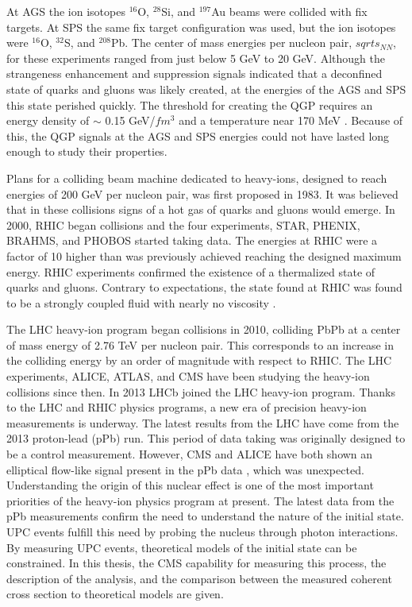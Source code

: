   At AGS the ion isotopes $^{16}$O, $^{28}$Si, and $^{197}$Au beams were 
    collided with fix targets. 
  At SPS the same fix target configuration was used, but the ion isotopes were 
    $^{16}$O, $^{32}$S, and $^{208}$Pb.
  The center of mass energies per nucleon pair, $sqrt{s_{NN}}$, for these 
    experiments ranged from just below 5 GeV to 20 GeV. 
  Although the strangeness enhancement and \JPsi{} suppression 
    signals indicated that a deconfined state of quarks and gluons was likely 
    created, at the energies of the AGS and SPS this state perished quickly. 
  The threshold for creating the QGP requires an energy density of $\sim$ 0.15 
    GeV/$fm$$^{3}$ and a temperature near 170 MeV \cite{qgpThresh}.
  Because of this, the QGP signals at the AGS and SPS energies could 
    not have lasted long enough to study their properties. 

  Plans for a colliding beam machine dedicated to heavy-ions, designed to reach 
    energies of 200 GeV per nucleon pair, was first proposed in 1983.
  It was believed that in these collisions signs of a hot gas of quarks and 
    gluons would emerge.
  In 2000, RHIC began collisions and the four experiments,
    STAR, PHENIX, BRAHMS, and PHOBOS started taking data. 
  The energies at RHIC were a factor of 10 higher than was previously achieved
    reaching the designed maximum energy. 
  RHIC experiments confirmed the existence of a  thermalized state of quarks and 
    gluons.
  Contrary to expectations, the state found at RHIC was found to be 
    a strongly coupled fluid with nearly no viscosity \cite{whi}.

  The LHC heavy-ion program began collisions in 2010, colliding PbPb at 
    a center of mass energy of 2.76 TeV per nucleon pair. 
  This corresponds to an increase in the colliding energy by an order of 
    magnitude with respect to RHIC. 
  The LHC experiments, ALICE, ATLAS, and CMS have been studying the heavy-ion 
    collisions since then. 
  In 2013 LHCb joined the LHC heavy-ion program. 
  Thanks to the LHC and RHIC physics programs, a new era of precision
    heavy-ion measurements is underway. 
  The latest results from the LHC have come from the 2013 proton-lead (pPb)
    run.
  This period of data taking was originally designed to be a control 
    measurement.
  However, CMS and ALICE have both shown an elliptical flow-like signal present
    in the pPb data \cite{}, which was unexpected.
  Understanding the origin of this nuclear effect is one of the most important
    priorities of the heavy-ion physics program at present. 
  The latest data from the pPb measurements confirm the need to 
    understand the nature of the initial state. 
  UPC events fulfill this need by probing the nucleus through photon 
    interactions.
  By measuring UPC \JPsi{} events, theoretical models of the initial state can 
    be constrained.
  In this thesis, the CMS capability for measuring this process, the 
    description of the analysis, and the comparison between the measured 
    coherent \JPsi{} cross section to theoretical models are given. 

